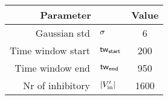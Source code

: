 
\begin{tabular}{rlc}
\hline
\multicolumn{2}{c}{\textbf{Parameter}}     & \textbf{Value} \\
\hline
Gaussian std            & ${\sigma}$                        & 6
\\
Time window start       & ${\mathsf{tw}_{\mathsf{start}}}$ & 200
\\
Time window end         & ${\mathsf{tw}_{\mathsf{end}}}$   & 950
\\
Nr of inhibitory        & ${|V'_{\mathrm{in}}|}$                              & 1600
\\ \hline                                
\end{tabular}
